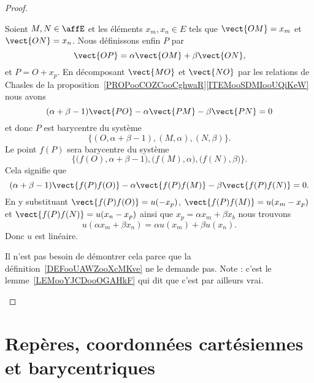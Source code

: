 \begin{proof}
\begin{subproof}
\begin{subproof}
			Soient \( M,N\in\affE\) et les éléments \( x_m,x_n\in E\) tels que \( \vect{ OM }=x_m\) et \( \vect{ ON }=x_n\). Nous définissons enfin \( P\) par
			\begin{equation}
				\vect{ OP }=\alpha \vect{ OM }+\beta\vect{ ON },
			\end{equation}
			et \( P=O+x_p\). En décomposant \( \vect{ MO }\) et \( \vect{ NO }\) par les relations de Chasles de la proposition~\ref{PROPooCOZCooCghwaR}\ref{ITEMooSDMIooUQiKeW} nous avons
			\begin{equation}
				(\alpha+\beta-1)\vect{ PO }-\alpha\vect{ PM }-\beta\vect{ PN }=0
			\end{equation}
			et donc \( P\) est barycentre du système
			\begin{equation}
				\big\{ (O,\alpha+\beta-1),(M,\alpha),(N,\beta) \}.
			\end{equation}
			Le point \( f(P)\) sera barycentre du système
			\begin{equation}
				\Big\{ \big( f(O), \alpha+\beta-1 \big),\big( f(M), \alpha \big), \big( f(N), \beta \big) \}.
			\end{equation}
			Cela signifie que
			\begin{equation}
				(\alpha+\beta-1)\vect{ f(P)f(O) }-\alpha\vect{ f(P)f(M) }-\beta\vect{ f(P)f(N) }=0.
			\end{equation}
			En y substituant \( \vect{ f(P)f(O) }=u(-x_p)\), \( \vect{ f(P)f(M) }=u(x_m-x_p)\) et \( \vect{ f(P)f(N) }=u(x_n-x_p)\) ainsi que \( x_p=\alpha x_m+\beta x_b\) nous trouvons
			\begin{equation}
				u(\alpha x_m+\beta x_n)=\alpha u(x_m)+\beta u(x_n).
			\end{equation}
			Donc \( u\) est linéaire.


			Il n'est pas besoin de démontrer cela parce que la définition~\ref{DEFooUAWZooXcMKve} ne le demande pas. Note : c'est le lemme~\ref{LEMooYJCDooOGAHkF} qui dit que c'est par ailleurs vrai.
		\end{subproof}
	\end{subproof}
\end{proof}

\section{Repères, coordonnées cartésiennes et barycentriques}

